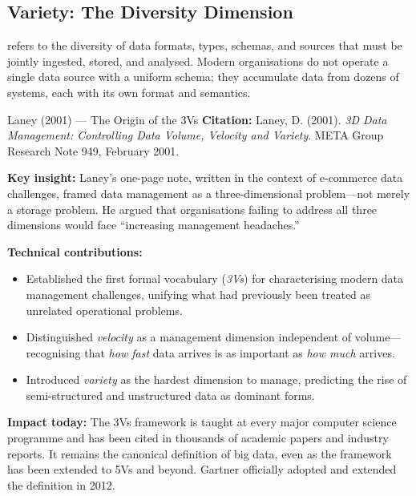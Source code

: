 \subsection{Variety: The Diversity Dimension}
\label{subsec:variety}

 refers to the diversity of data formats, types, schemas,
and sources that must be jointly ingested, stored, and analysed. Modern
organisations do not operate a single data source with a uniform schema;
they accumulate data from dozens of systems, each with its own format
and semantics.
\begin{researchspotlight}{Laney (2001) --- The Origin of the 3Vs}
\textbf{Citation:} Laney, D. (2001). \textit{3D Data Management:
Controlling Data Volume, Velocity and Variety}. META Group Research
Note 949, February 2001. \parencite{Laney2001}

\smallskip\noindent
\textbf{Key insight:} Laney's one-page note, written in the context of
e-commerce data challenges, framed data management as a three-dimensional
problem---not merely a storage problem. He argued that organisations
failing to address all three dimensions would face ``increasing
management headaches.''

\smallskip\noindent
\textbf{Technical contributions:}
\begin{itemize}
  \item Established the first formal vocabulary (\emph{3Vs}) for
        characterising modern data management challenges, unifying what
        had previously been treated as unrelated operational problems.
  \item Distinguished \emph{velocity} as a management dimension
        independent of volume---recognising that \emph{how fast} data
        arrives is as important as \emph{how much} arrives.
  \item Introduced \emph{variety} as the hardest dimension to manage,
        predicting the rise of semi-structured and unstructured data as
        dominant forms.
\end{itemize}

\smallskip\noindent
\textbf{Impact today:} The 3Vs framework is taught at every major
computer science programme and has been cited in thousands of academic
papers and industry reports. It remains the canonical definition of big
data, even as the framework has been extended to 5Vs and beyond. Gartner
officially adopted and extended the definition in 2012.
\end{researchspotlight}

